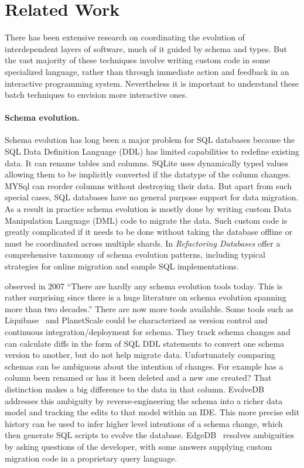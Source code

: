 \documentclass[english,submission]{programming}
\begin{document}
\section{Related Work}
\label{sec:related}

There has been extensive research on coordinating the evolution of interdependent layers of software, much of it guided by schema and types. But the vast majority of these techniques involve writing custom code in some specialized language, rather than through immediate action and feedback in an interactive programming system. Nevertheless it is important to understand these batch techniques to envision more interactive ones.

\paragraph{Schema evolution.}
Schema evolution has long been a major problem for SQL databases because
the SQL Data Definition Language (DDL) has limited capabilities to redefine existing data. It can rename tables and columns. SQLite \cite{sqliteDatatypes} uses dynamically typed values allowing them to be implicitly converted if the datatype of the column changes.
MYSql \cite{mysqlAlterTable} can reorder columns without destroying their data. But apart from such special cases, SQL databases have no general purpose support for data migration. As a result in practice schema evolution is mostly done by writing custom Data Manipulation Language (DML) code to migrate the data. Such custom code is greatly complicated if it needs to be done without taking the database offline or must be coordinated across multiple shards.
In \emph{Refactoring Databases} \citet{ambler06} offer a comprehensive taxonomy of schema evolution patterns, including typical strategies for online migration and sample SQL implementations.

\citet{bernstein07} observed in 2007 ``There are hardly any schema evolution tools today. This is rather surprising since there is a huge literature on schema evolution spanning more than two decades.'' There are now more tools available. Some tools such as Liquibase~\cite{liquibase} and PlanetScale\cite{planetscale} could be characterized as version control and continuous integration/deployment for schema. They track schema changes and can calculate diffs in the form of SQL DDL statements to convert one schema version to another, but do not help migrate data. Unfortunately comparing schemas can be ambiguous about the intention of changes. For example has a column been renamed or has it been deleted and a new one created? That distinction makes a big difference to the data in that column. EvolveDB\cite{evolvedb} addresses this ambiguity by reverse-engineering the schema into a richer data model and tracking the edits to that model within an IDE. This more precise edit history can be used to infer higher level intentions of a schema change, which then generate SQL scripts to evolve the database. EdgeDB~\cite{edgedb} resolves ambiguities by asking questions of the developer, with some answers supplying custom migration code in a proprietary query language.
\end{document}
